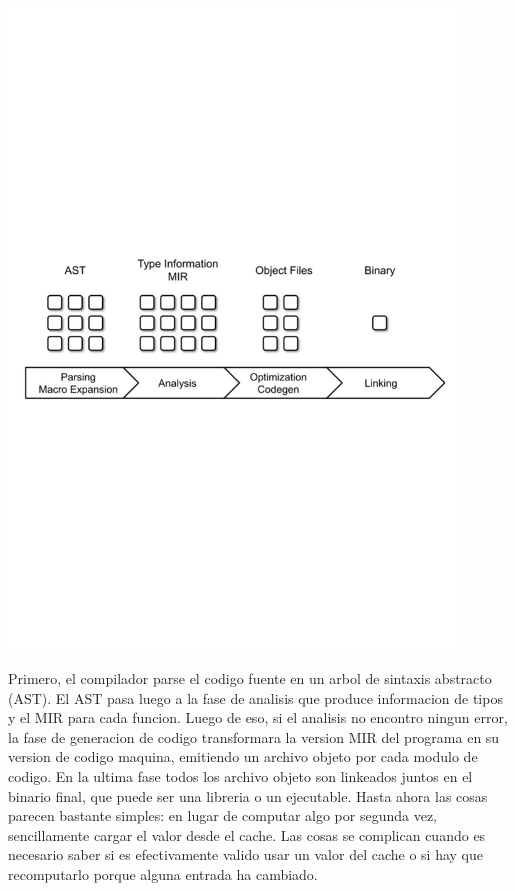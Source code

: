 \documentclass[12pt, a4paper]{report}
\begin{document}
\noindent
\includegraphics[width=0.9\textwidth]{woe16_compiler_phases}

Primero, el compilador parse el codigo fuente en un arbol de sintaxis abstracto (AST).
El AST pasa luego a la fase de analisis que produce informacion de tipos y el MIR para cada funcion.
Luego de eso, si el analisis no encontro ningun error, la fase de generacion de codigo transformara la version MIR del programa en su version de codigo maquina, emitiendo un archivo objeto por cada modulo de codigo.
En la ultima fase todos los archivo objeto son linkeados juntos en el binario final, que puede ser una libreria o un ejecutable.
Hasta ahora las cosas parecen bastante simples: en lugar de computar algo por segunda vez, sencillamente cargar el valor desde el cache.
Las cosas se complican cuando es necesario saber si es efectivamente valido usar un valor del cache o si hay que recomputarlo porque alguna entrada ha cambiado.
\cite{rust_blog_incremental_compilation}

\end{document}
